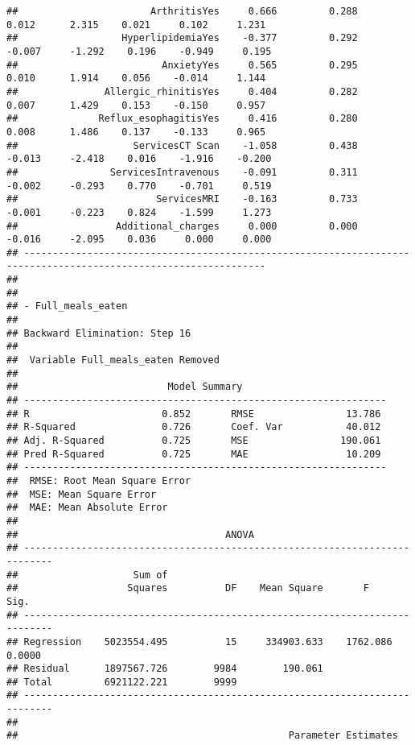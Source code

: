\documentclass[
]{article}
\begin{document}
\begin{verbatim}
##                       ArthritisYes     0.666         0.288        0.012      2.315    0.021     0.102     1.231 
##                  HyperlipidemiaYes    -0.377         0.292       -0.007     -1.292    0.196    -0.949     0.195 
##                         AnxietyYes     0.565         0.295        0.010      1.914    0.056    -0.014     1.144 
##               Allergic_rhinitisYes     0.404         0.282        0.007      1.429    0.153    -0.150     0.957 
##              Reflux_esophagitisYes     0.416         0.280        0.008      1.486    0.137    -0.133     0.965 
##                    ServicesCT Scan    -1.058         0.438       -0.013     -2.418    0.016    -1.916    -0.200 
##                ServicesIntravenous    -0.091         0.311       -0.002     -0.293    0.770    -0.701     0.519 
##                        ServicesMRI    -0.163         0.733       -0.001     -0.223    0.824    -1.599     1.273 
##                 Additional_charges     0.000         0.000       -0.016     -2.095    0.036     0.000     0.000 
## ----------------------------------------------------------------------------------------------------------------
## 
## 
## - Full_meals_eaten 
## 
## Backward Elimination: Step 16 
## 
##  Variable Full_meals_eaten Removed 
## 
##                          Model Summary                          
## ---------------------------------------------------------------
## R                       0.852       RMSE                13.786 
## R-Squared               0.726       Coef. Var           40.012 
## Adj. R-Squared          0.725       MSE                190.061 
## Pred R-Squared          0.725       MAE                 10.209 
## ---------------------------------------------------------------
##  RMSE: Root Mean Square Error 
##  MSE: Mean Square Error 
##  MAE: Mean Absolute Error 
## 
##                                    ANOVA                                    
## ---------------------------------------------------------------------------
##                    Sum of                                                  
##                   Squares          DF    Mean Square       F          Sig. 
## ---------------------------------------------------------------------------
## Regression    5023554.495          15     334903.633    1762.086    0.0000 
## Residual      1897567.726        9984        190.061                       
## Total         6921122.221        9999                                      
## ---------------------------------------------------------------------------
## 
##                                               Parameter Estimates                                                

\end{verbatim}
\end{document}
